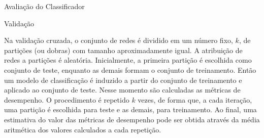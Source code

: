 \begin{section}{Avaliação do Classificador}
\begin{subsection}{Validação}


		Na validação cruzada, o conjunto de redes é dividido em um número fixo, $k$, de partições (ou dobras) com tamanho aproximadamente igual. A atribuição de redes a partições é aleatória. Inicialmente, a primeira partição é escolhida como conjunto de teste, enquanto as demais formam o conjunto de treinamento. Então um modelo de classificação é induzido a partir do conjunto de treinamento e aplicado ao conjunto de teste. Nesse momento são calculadas as métricas de desempenho. O procedimento é repetido $k$ vezes, de forma que, a cada iteração, uma partição é escolhida para teste e as demais, para treinamento. Ao final, uma estimativa do valor das métricas de desempenho pode ser obtida através da média aritmética dos valores calculados a cada repetição.


\end{subsection}
\end{section}
